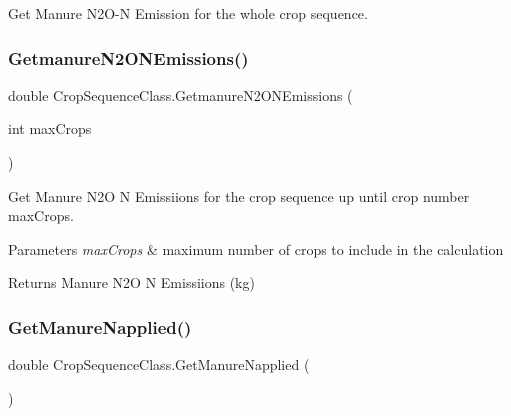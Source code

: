 Get Manure N2\+O-\/N Emission for the whole crop sequence. 

\mbox{\label{class_crop_sequence_class_a6483d720e357417e677ef60d3dd926dc}} 
\subsubsection{\texorpdfstring{GetmanureN2ONEmissions()}{GetmanureN2ONEmissions()}\hspace{0.1cm}{\footnotesize\ttfamily [2/2]}}
{\footnotesize\ttfamily double Crop\+Sequence\+Class.\+Getmanure\+N2\+O\+N\+Emissions (\begin{DoxyParamCaption}\item[{int}]{max\+Crops }\end{DoxyParamCaption})\hspace{0.3cm}{\ttfamily [inline]}}



Get Manure N2O N Emissiions for the crop sequence up until crop number max\+Crops. 


\begin{DoxyParams}{Parameters}
{\em max\+Crops} & maximum number of crops to include in the calculation \\
\hline
\end{DoxyParams}
\begin{DoxyReturn}{Returns}
Manure N2O N Emissiions (kg) 
\end{DoxyReturn}
\mbox{\label{class_crop_sequence_class_a1924ad8fa6a78b9e34d23251a32f2f62}} 
\subsubsection{\texorpdfstring{GetManureNapplied()}{GetManureNapplied()}\hspace{0.1cm}{\footnotesize\ttfamily [1/2]}}
{\footnotesize\ttfamily double Crop\+Sequence\+Class.\+Get\+Manure\+Napplied (\begin{DoxyParamCaption}{ }\end{DoxyParamCaption})\hspace{0.3cm}{\ttfamily [inline]}}



